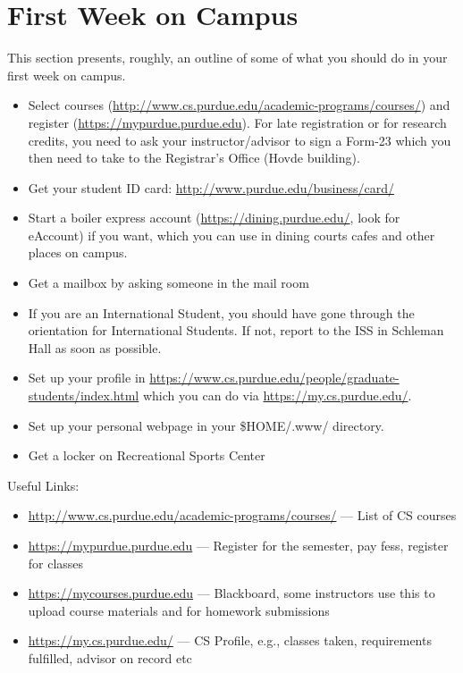 \section{First Week on Campus}

This section presents, roughly, an outline of some of what you should do in your first week on campus.

\begin{itemize}
	\item Select courses (\url{http://www.cs.purdue.edu/academic-programs/courses/}) and register (\url{https://mypurdue.purdue.edu}). For late registration or for research credits, you need to ask your instructor/advisor to sign a Form-23 which you then need to take to the Registrar's Office (Hovde building).

	\item Get your student ID card: \url{http://www.purdue.edu/business/card/}

	\item Start a boiler express account (\url{https://dining.purdue.edu/}, look for eAccount) if you want, which you can use in dining courts cafes and other places on campus.

	\item Get a mailbox by asking someone in the mail room

	\item If you are an International Student, you should have gone through the orientation for International Students. If not, report to the ISS in Schleman Hall as soon as possible.

	\item Set up your profile in \url{https://www.cs.purdue.edu/people/graduate-students/index.html} which you can do via \url{https://my.cs.purdue.edu/}.

	\item Set up your personal webpage in your \$HOME/.www/ directory.

	\item Get a locker on Recreational Sports Center

\end{itemize}

Useful Links:
\begin{itemize}
	\item \url{http://www.cs.purdue.edu/academic-programs/courses/} --- List of CS courses

	\item \url{https://mypurdue.purdue.edu} --- Register for the semester, pay fess, register for classes

	\item \url{https://mycourses.purdue.edu} --- Blackboard, some instructors use this to upload course materials and for homework submissions

	\item \url{https://my.cs.purdue.edu/} --- CS Profile, e.g., classes taken, requirements fulfilled, advisor on record etc
\end{itemize}
